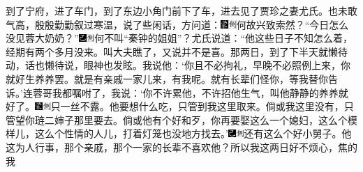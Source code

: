 到了宁府，进了车门，到了东边小角门前下了车，进去见了贾珍之妻尤氏。也未敢气高，殷殷勤勤叙过寒温，说了些闲话，方问道：{\includegraphics[width=3mm]{../Images/00006}\includegraphics[width=3mm]{../Images/00011}\footnotesize \kaishu 何故兴致索然？}``今日怎么没见蓉大奶奶？''{\includegraphics[width=3mm]{../Images/00003}\includegraphics[width=3mm]{../Images/00011}\footnotesize \kaishu 何不叫``秦钟的姐姐''？}尤氏说道：``他这些日子不知怎么着，经期有两个多月没来。叫大夫瞧了，又说并不是喜。那两日，到了下半天就懒待动，话也懒待说，眼神也发眩。我说他：`你且不必拘礼，早晚不必照例上来，你就好生养养罢。就是有亲戚一家儿来，有我呢。就有长辈们怪你，等我替你告诉。'连蓉哥我都嘱咐了，我说：`你不许累他，不许招他生气，叫他静静的养养就好了。{\includegraphics[width=3mm]{../Images/00006}\includegraphics[width=3mm]{../Images/00011}\footnotesize \kaishu 只一丝不露。}他要想什么吃，只管到我这里取来。倘或我这里没有，只管望你琏二婶子那里要去。倘或他有个好和歹，你再要娶这么一个媳妇，这么个模样儿，这么个性情的人儿，打着灯笼也没地方找去。'{\includegraphics[width=3mm]{../Images/00003}\includegraphics[width=3mm]{../Images/00011}\footnotesize \kaishu 还有这么个好小舅子。}他这为人行事，那个亲戚，那个一家的长辈不喜欢他？所以我这两日好不烦心，焦的我